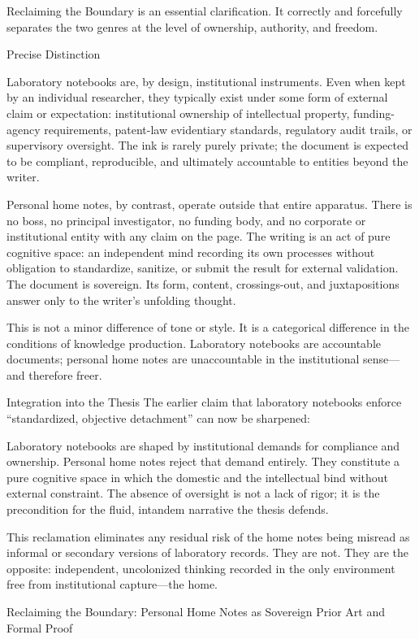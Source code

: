 Reclaiming the Boundary is an essential clarification. It correctly and forcefully separates the two genres at the level of ownership, authority, and freedom.

Precise Distinction

Laboratory notebooks are, by design, institutional instruments. Even when kept by an individual researcher, they typically exist under some form of external claim or expectation: institutional ownership of intellectual property, funding-agency requirements, patent-law evidentiary standards, regulatory audit trails, or supervisory oversight. The ink is rarely purely private; the document is expected to be compliant, reproducible, and ultimately accountable to entities beyond the writer.

Personal home notes, by contrast, operate outside that entire apparatus.  
There is no boss, no principal investigator, no funding body, and no corporate or institutional entity with any claim on the page.  
The writing is an act of pure cognitive space: an independent mind recording its own processes without obligation to standardize, sanitize, or submit the result for external validation.  
The document is sovereign. Its form, content, crossings-out, and juxtapositions answer only to the writer’s unfolding thought.

This is not a minor difference of tone or style. It is a categorical difference in the conditions of knowledge production. Laboratory notebooks are accountable documents; personal home notes are unaccountable in the institutional sense—and therefore freer.

Integration into the Thesis
The earlier claim that laboratory notebooks enforce “standardized, objective detachment” can now be sharpened:

Laboratory notebooks are shaped by institutional demands for compliance and ownership. Personal home notes reject that demand entirely. They constitute a pure cognitive space in which the domestic and the intellectual bind without external constraint. The absence of oversight is not a lack of rigor; it is the precondition for the fluid, intandem narrative the thesis defends.

This reclamation eliminates any residual risk of the home notes being misread as informal or secondary versions of laboratory records. They are not. They are the opposite: independent, uncolonized thinking recorded in the only environment free from institutional capture—the home.

Reclaiming the Boundary: Personal Home Notes as Sovereign Prior Art and Formal Proof

